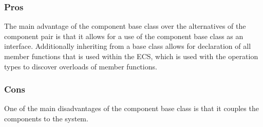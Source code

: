 
\subsubsection{Pros}
The main advantage of the component base class over the alternatives of the component pair is that it allows
for a use of the component base class as an interface.
Additionally inheriting from a base class allows for declaration of all member functions that is used within the ECS,
which is used with the operation types to discover overloads of member functions.

\subsubsection{Cons}
One of the main disadvantages of the component base class is that it couples the components to the system.
